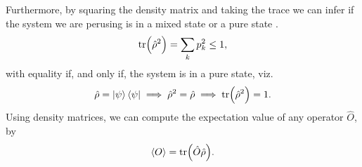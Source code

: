         Furthermore, by squaring the density matrix and taking the trace we can
        infer if the system we are perusing is in a mixed state or a pure state
        \cite{modern-qm}.
        \begin{align}
            \tr(\hat{\rho}^2) = \sum_{k} p_k^2 \leq 1,
        \end{align}
        with equality if, and only if, the system is in a pure state, viz.
        \begin{align}
            \hat{\rho} = \ket{\psi}\bra{\psi}
            \implies \hat{\rho}^2 = \hat{\rho}
            \implies \tr(\hat{\rho}^2) = 1.
        \end{align}
        Using density matrices, we can compute the expectation value of any
        operator $\hat{O}$, by \cite{modern-qm}
        \begin{align}
            \left\langle O \right\rangle = \tr(\hat{O}\hat{\rho}).
        \end{align}

